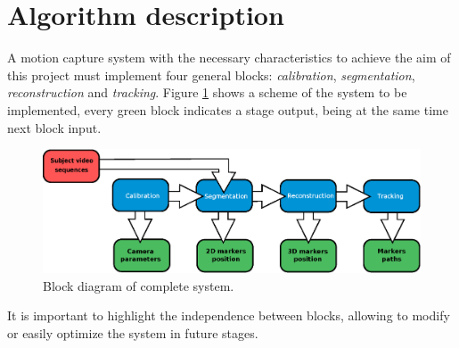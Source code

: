 \section{Algorithm description}\label{implementacion}
A motion capture system with the necessary characteristics to achieve the aim of this project must implement four general blocks: 
\emph{calibration}, \emph{segmentation}, \emph{reconstruction} and \emph{tracking}. Figure \ref{bloquesSist} shows a scheme of the system to be implemented, every green block indicates a stage output, being at the same time next block input.
\begin{figure}[ht!]
\centering
\hspace{-0.5cm}
\includegraphics[scale=0.4]{imagenes/Sistema_completo/Diagrama_de_bloques.eps}
\caption{Block diagram of complete system.}
\label{bloquesSist}
\end{figure}

It is important to highlight the independence between blocks, allowing to modify or easily optimize the system in future stages.
